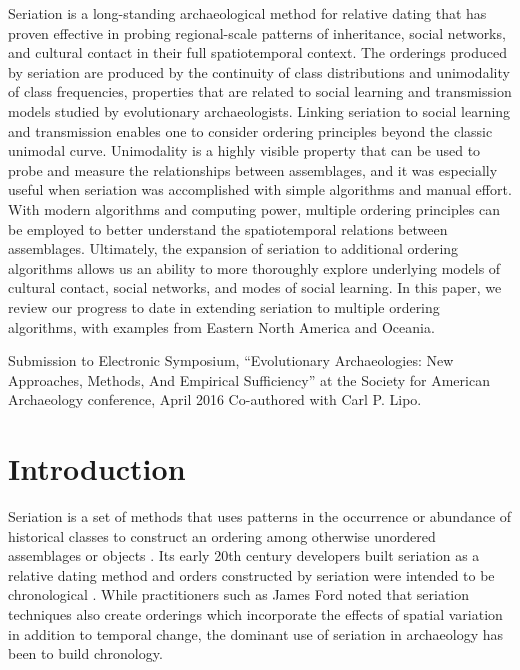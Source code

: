 \begin{description}[leftmargin=-1\labelwidth]
\item[\textsc{Abstract}] Seriation is a long-standing archaeological method for relative dating that has proven effective in probing regional-scale patterns of inheritance, social networks, and cultural contact in their full spatiotemporal context. The orderings produced by seriation are produced by the continuity of class distributions and unimodality of class frequencies, properties that are related to social learning and transmission models studied by evolutionary archaeologists. Linking seriation to social learning and transmission enables one to consider ordering principles beyond the classic unimodal curve. Unimodality is a highly visible property that can be used to probe and measure the relationships between assemblages, and it was especially useful when seriation was accomplished with simple algorithms and manual effort. With modern algorithms and computing power, multiple ordering principles can be employed to better understand the spatiotemporal relations between assemblages. Ultimately, the expansion of seriation to additional ordering algorithms allows us an ability to more thoroughly explore underlying models of cultural contact, social networks, and modes of social learning. In this paper, we review our progress to date in extending seriation to multiple ordering algorithms, with examples from Eastern North America and Oceania.

\item[\textsc{Source}]  Submission to Electronic Symposium, ``Evolutionary Archaeologies: New Approaches, Methods, And Empirical
Sufficiency'' at the Society for American Archaeology conference, April 2016  Co-authored with Carl P. Lipo.  
\end{description}


\section{Introduction}\label{multser:sec:introduction}

Seriation is a set of methods that uses patterns in the occurrence or
abundance of historical classes to construct an ordering among otherwise
unordered assemblages or objects \citep{Dunnell1970}. Its early 20th
century developers built seriation as a relative dating method and
orders constructed by seriation were intended to be chronological
\citep{o2000applying, o1998james, Lyman:2006aa, OBrien1999b, lyman1997rise}.
While practitioners such as James Ford
\citep{Ford:1938aa, PFG1951, Ford1935a} noted that seriation
techniques also create orderings which incorporate the effects of
spatial variation in addition to temporal change, the dominant use of
seriation in archaeology has been to build chronology.

